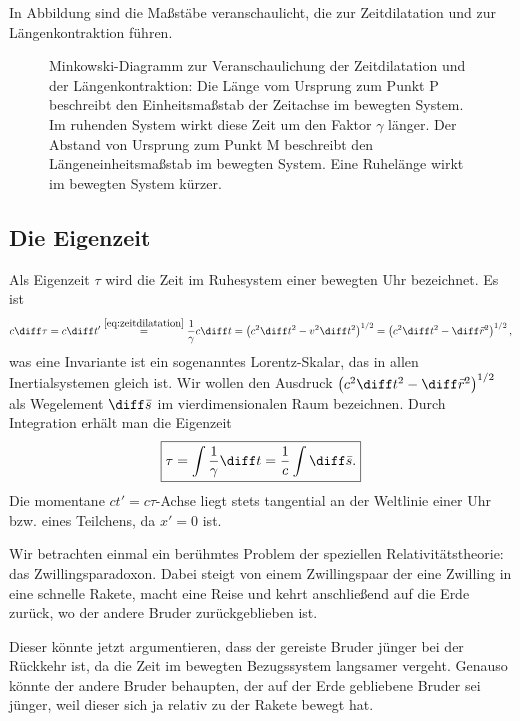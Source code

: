 In Abbildung  sind die Maßstäbe veranschaulicht, die zur Zeitdilatation und zur Längenkontraktion führen.

\begin{figure}[htp]
    \centering
    \tfigMinkowskiTimeDilatationLengthContraction
    \caption{Minkowski-Diagramm zur Veranschaulichung der Zeitdilatation und der Längenkontraktion:
        Die Länge vom Ursprung zum Punkt P beschreibt den Einheitsmaßstab der Zeitachse im bewegten System.
        Im ruhenden System wirkt diese Zeit um den Faktor $\gamma$ länger.
        Der Abstand von Ursprung zum Punkt M beschreibt den Längeneinheitsmaßstab im bewegten System.
        Eine Ruhelänge wirkt im bewegten System kürzer. }
    \label{fig:minkowski_zeitdilatation_laengenkontraktion}
\end{figure}



\subsection{Die Eigenzeit}

Als Eigenzeit $\tau$ wird die Zeit im Ruhesystem einer bewegten Uhr bezeichnet. Es ist
\begin{align*}
    c\diff\tau=c\diff t' \overset{\eqref{eq:zeitdilatation}}{=} \frac{1}{\gamma} c\diff t =\left(c^2\diff t^2-v^2\diff t^2\right)^{1/2} = \left(c^2\diff t^2-\diff\vec r^2\right)^{1/2},
\end{align*}
was eine Invariante ist \textendash{} ein sogenanntes Lorentz-Skalar, das in allen Inertialsystemen gleich ist.
Wir wollen den Ausdruck $\left(c^2\diff t^2-\diff\vec r^2\right)^{1/2}$ als Wegelement $\diff\bar{s}$ im vierdimensionalen Raum bezeichnen.
Durch Integration erhält man die Eigenzeit
\begin{align*}
    \boxed{\tau=\int \frac{1}{\gamma}\diff t=\frac{1}{c}\int\diff\bar{s}.}
\end{align*}
Die momentane $ct'=c\tau$-Achse liegt stets tangential an der Weltlinie einer Uhr bzw. eines Teilchens, da $x'=0$ ist.

Wir betrachten einmal ein berühmtes Problem der speziellen Relativitätstheorie: das Zwillingsparadoxon.
Dabei steigt von einem Zwillingspaar der eine Zwilling in eine schnelle Rakete, macht eine Reise und kehrt anschließend auf die Erde zurück, wo der andere Bruder zurückgeblieben ist.

Dieser könnte jetzt argumentieren, dass der gereiste Bruder jünger bei der Rückkehr ist, da die Zeit im bewegten Bezugssystem langsamer vergeht.
Genauso könnte der andere Bruder behaupten, der auf der Erde gebliebene Bruder sei jünger, weil dieser sich ja relativ zu der Rakete bewegt hat.

